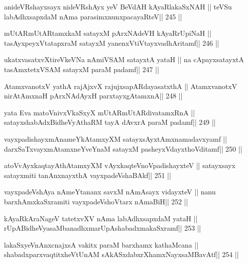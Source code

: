 \begin{shl}
anideVRshayxsayx nideVRshAyx yeV BeVdAH kAyaRlakaSxNAH ||
teVSu labAdhxsapxdaM nAma parasimxnunxpacayaRteV\hfill || 245 ||
\end{shl}

\begin{shl}
mUtARmUtARtamxkaM satayxM pArxNAdeVH kAyaRrUpiNaH ||
tasAyxpeyxVtatapxraM satayxM yanenxVtiVtayxvadhAritamf\hfill || 246 ||
\end{shl}

\begin{shl}
ukatxvasatxvXtireVkeVNa nAmiVSAM satayxtA yataH ||
na cApayxsatayxtA tasAmxtetxVSAM satayxM paraM padamf\hfill || 247 ||
\end{shl}

\begin{shl}
AtamxvanotxV yathA rajAjxvX rajujxsapARdayasatxthA ||
AtamxvanotxV nirAtAmxnaH pArxNAdAyxH parxtayxgAtamxnA\hfill || 248 ||
\end{shl}

\begin{shl}
yata Eva matoV\s nivxVkaSxyX mUtARmUtARdivatamxRnA ||
satayxshabAdxBidheVyAthaRM tayA dAvxrA paraM padamf\hfill || 249 ||
\end{shl}

\begin{shl}
vayxpadishayxmAnameYkAtamxyXM satayxsAyx\s\s tAmxnamadavxyamf ||
darxSaTxvayxmAtamxneYveYnaM satayxM pasheyxVdayxthoVditamf\hfill || 250 ||
\end{shl}

\begin{shl}
atoV\s vAyxkaqtayAthAtamxyXM vAyxkaqteVnoVpadishayxteV ||
satayxsayx satayxmiti tanAnxnayxthA vayxpadeVshaBAkf\hfill || 251 ||
\end{shl}

\begin{shl}
vayxpadeVshAya nAmeYtananx savxM nAmAsayx vidayxteV ||
nanu barxhAmxkaSxramiti vayxpadeVshoV\s tarx nAmaBiH\hfill || 252 ||
\end{shl}

\begin{shl}
kAyaRkAraNageV tatetxvXV nAma labAdhxsapxdaM yataH ||
rUpABidheVyasaMbanadhxmarUpAshabadxmakaSxramf\hfill || 253 ||
\end{shl}

\begin{shl}
lakaSxyeVnAnxcnajxsA vakitx paraM barxhamx kathaMcana ||
shabadxparxvaqtitxheVtUnAM sAkASxdabxrXhamxNayxsaMBavAtf\hfill || 254 ||
\end{shl}

